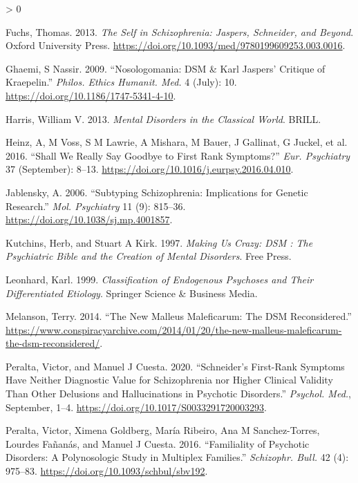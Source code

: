 \documentclass[
]{article}
\newlength{\cslhangindent}
\newenvironment{CSLReferences}[2] %
 {%
  \setlength{\parindent}{0pt}
  \ifodd #1 \everypar{\setlength{\hangindent}{\cslhangindent}}\ignorespaces\fi
  \ifnum #2 > 0
  \setlength{\parskip}{#2\baselineskip}
  \fi
 }%
 {}
\begin{document}
\begin{CSLReferences}{1}{0}
\leavevmode\hypertarget{ref-Fuchs2013-in}{}%
Fuchs, Thomas. 2013. \emph{The Self in Schizophrenia: Jaspers,
Schneider, and Beyond}. Oxford University Press.
\url{https://doi.org/10.1093/med/9780199609253.003.0016}.

\leavevmode\hypertarget{ref-Ghaemi2009-ek}{}%
Ghaemi, S Nassir. 2009. {``Nosologomania: {DSM} \& Karl Jaspers'
Critique of Kraepelin.''} \emph{Philos. Ethics Humanit. Med.} 4 (July):
10. \url{https://doi.org/10.1186/1747-5341-4-10}.

\leavevmode\hypertarget{ref-Harris2013-lp}{}%
Harris, William V. 2013. \emph{Mental Disorders in the Classical World}.
BRILL.

\leavevmode\hypertarget{ref-Heinz2016-km}{}%
Heinz, A, M Voss, S M Lawrie, A Mishara, M Bauer, J Gallinat, G Juckel,
et al. 2016. {``Shall We Really Say Goodbye to First Rank Symptoms?''}
\emph{Eur. Psychiatry} 37 (September): 8--13.
\url{https://doi.org/10.1016/j.eurpsy.2016.04.010}.

\leavevmode\hypertarget{ref-Jablensky2006-ol}{}%
Jablensky, A. 2006. {``Subtyping Schizophrenia: Implications for Genetic
Research.''} \emph{Mol. Psychiatry} 11 (9): 815--36.
\url{https://doi.org/10.1038/sj.mp.4001857}.

\leavevmode\hypertarget{ref-Kutchins1997-ju}{}%
Kutchins, Herb, and Stuart A Kirk. 1997. \emph{Making Us Crazy: {DSM} :
The Psychiatric Bible and the Creation of Mental Disorders}. Free Press.

\leavevmode\hypertarget{ref-Leonhard1999-mx}{}%
Leonhard, Karl. 1999. \emph{Classification of Endogenous Psychoses and
Their Differentiated Etiology}. Springer Science \& Business Media.

\leavevmode\hypertarget{ref-Melanson2014-pu}{}%
Melanson, Terry. 2014. {``The New Malleus Maleficarum: The {DSM}
Reconsidered.''}
\url{https://www.conspiracyarchive.com/2014/01/20/the-new-malleus-maleficarum-the-dsm-reconsidered/}.

\leavevmode\hypertarget{ref-Peralta2020-qa}{}%
Peralta, Victor, and Manuel J Cuesta. 2020. {``Schneider's First-Rank
Symptoms Have Neither Diagnostic Value for Schizophrenia nor Higher
Clinical Validity Than Other Delusions and Hallucinations in Psychotic
Disorders.''} \emph{Psychol. Med.}, September, 1--4.
\url{https://doi.org/10.1017/S0033291720003293}.

\leavevmode\hypertarget{ref-Peralta2016-bf}{}%
Peralta, Victor, Ximena Goldberg, María Ribeiro, Ana M Sanchez-Torres,
Lourdes Fañanás, and Manuel J Cuesta. 2016. {``Familiality of Psychotic
Disorders: A Polynosologic Study in Multiplex Families.''}
\emph{Schizophr. Bull.} 42 (4): 975--83.
\url{https://doi.org/10.1093/schbul/sbv192}.


\end{CSLReferences}
\end{document}
